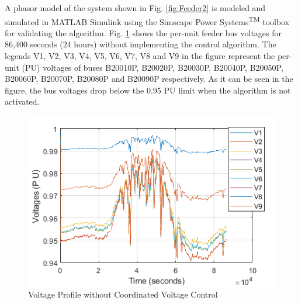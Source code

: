 A phasor model of the system shown in Fig. \ref{fig:Feeder2} is modeled and simulated  in MATLAB\textsuperscript{\textregistered} Simulink\textsuperscript{\textregistered} using the Simscape Power Systems\textsuperscript{TM} toolbox for validating the algorithm. Fig. \ref{fig:without_vvc} shows the per-unit feeder bus voltages for 86,400 seconds (24 hours) without implementing the control algorithm. The legends V1, V2, V3, V4, V5, V6, V7, V8 and V9 in the figure represent the per-unit (PU) voltages of buses B20010P, B20020P, B20030P, B20040P, B20050P, B20060P, B20070P, B20080P and B20090P respectively. As it can be seen in the figure, the bus voltages drop below the 0.95 PU limit  when the algorithm is not activated.

\begin{figure}[!h]
\centering
\includegraphics[width=\linewidth]{figs/CVC/Without_VVC.png}
\caption{Voltage Profile without Coordinated Voltage Control}
\label{fig:without_vvc}
\end{figure}

